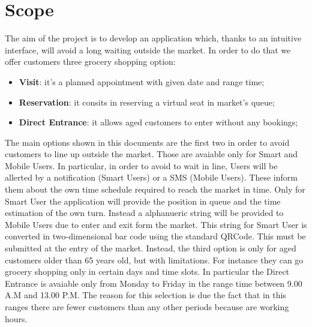  
\section{Scope}

The aim of the project is to develop an application which, thanks to an intuitive interface, will avoid a long waiting outside the market.
In order to do that we offer customers three grocery shopping option: 

\begin{itemize}
\item \textbf{Visit}: it's a planned appointment with given date and range time;
\item \textbf{Reservation}: it consits in reserving a virtual seat in market's queue;
\item \textbf{Direct Entrance}: it allows aged customers to enter without any bookings;
\end{itemize}
The main options shown in this documents are the first two in order to avoid customers to line up outside the market. Those are avaiable only for Smart and Mobile Users.
In particular, in order to avoid to wait in line, Users will be allerted by a notification (Smart Users) or a SMS (Mobile Users). These inform them about the own time schedule required to reach the market in time.
Only for Smart User the application will provide the position in queue and the time estimation of the own turn.
Instead a alphanueric string will be provided to Mobile Users due to enter and exit form the market. This string for Smart User is converted in two-dimensional bar code using the standard QRCode. This must be submitted at the entry of the market.
Instead, the third option is only for aged customers older than 65 years old, but with limitations. For instance they can go grocery shopping only in certain days and time slots. 
In particular the Direct Entrance is avaiable only from Monday to Friday in the range time between 9.00 A.M and 13.00 P.M. The reason for this selection is due the fact that in this ranges there are fewer customers than any other periods because are working hours. 




